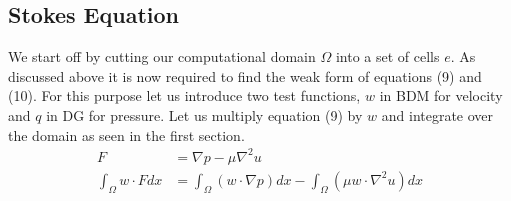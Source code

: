\documentclass[11pt,twoside,a4paper]{article}
\begin{document}
\subsection{Stokes Equation}
We start off by cutting our computational domain $\Omega$ into a set of cells $e$. As discussed above it is now required to find the weak form of equations (9) and (10).
For this purpose let us introduce two test functions, $w$ in BDM for velocity and $q$ in DG for pressure.
Let us multiply equation (9) by $w$ and integrate over the domain as seen in the first section.
\begin{align*}
F &= \nabla p - \mu \nabla^2 u \\
\int_\Omega w \cdot F dx &= \int_\Omega (w \cdot \nabla p) dx - \int_\Omega (\mu w \cdot \nabla^2 u) dx
\end{align*}
\end{document}
